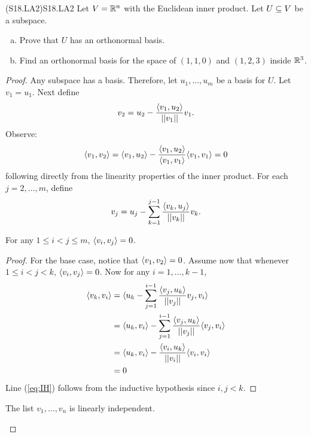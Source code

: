 \documentclass[../AlgebraQualSolutions.tex]{subfiles}
\begin{document}
\begin{prob}{(S18.LA2)}{S18.LA2}
    Let $V = \R^n$ with the Euclidean inner product. Let $U \sq V$ be a subspace.
    \begin{enumerate}[(a)]
        \item Prove that $U$ has an orthonormal basis.
        \item Find an orthonormal basis for the space of $(1,1,0)$ and $(1,2,3)$ inside $\R^3$.
    \end{enumerate}
\end{prob}

\begin{proof}
    Any subspace has a basis. Therefore, let $u_1,\ldots, u_m$ be a basis for $U$. Let $v_1 = u_1$. Next define
        \[v_2 = u_2 - \frac{\ip{v_1}{u_2}}{\norm[v_1]}v_1.\]
    Observe:
        \[\ip{v_1}{v_2} = \ip{v_1}{u_2} - \frac{\ip{v_1}{u_2}}{\ip{v_1}{v_1}}\ip{v_1}{v_1} = 0\]
    following directly from the linearity properties of the inner product. For each $j = 2,\ldots,m$, define
        \[v_j = u_j - \sum_{k=1}^{j-1}\frac{\ip{v_k}{u_j}}{\norm[v_k]}v_k.\]

        \begin{claim}
            For any $1 \leq i < j \leq m$, $\ip{v_i}{v_j} = 0$.

            \begin{proof}
                For the base case, notice that $\ip{v_1}{v_2} = 0$. Assume now that whenever $1 \leq i < j < k$, $\ip{v_i}{v_j} = 0$. Now for any $i = 1, \ldots, k-1$,
                    \begin{align*}
                        \ip{v_k}{v_i} &= \ip{u_k - \sum_{j=1}^{i-1} \frac{\ip{v_j}{u_k}}{\norm[v_j]}v_j}{v_i}\\
                        &= \ip{u_k}{v_i} - \sum_{j=1}^{i-1} \frac{\ip{v_j}{u_k}}{\norm[v_j]}\ip{v_j}{v_i}\\
                        &= \ip{u_k}{v_i} - \frac{\ip{v_i}{u_k}}{\norm[v_i]}\ip{v_i}{v_i} \label{eq:IH}\\
                        &= 0
                    \end{align*}
                Line (\ref{eq:IH}) follows from the inductive hypothesis since $i, j < k$.
            \end{proof}
        \end{claim}

        \begin{claim}
            The list $v_1, \ldots, v_n$ is linearly independent.


\end{claim}
\end{proof}
\end{document}
